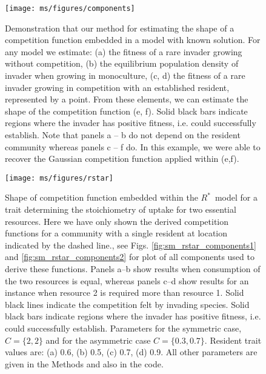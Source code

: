 \documentclass[a4paper,11pt]{article}
\newcommand{\todo}[1]{{\color{navy}{(todo: #1)}}}
\newcommand{\Rstar}{\ensuremath{R^*}}
\begin{document}
\begin{figure}[ht]
 \centering
 \texttt{[image: ms/figures/components]}
 \caption{Demonstration that our method for estimating the shape of a competition function embedded in a model with known solution. For any model we estimate: (a) the fitness of a rare invader growing without competition, (b) the equilibrium population density of invader when growing in monoculture, (c, d) the fitness of a rare invader growing in competition with an established resident, represented by a point. From these elements, we can estimate the shape of the competition function (e, f). Solid black bars indicate regions where the invader has positive fitness, i.e. could successfully establish. Note that panels a -- b do not depend on the resident community whereas panels c -- f do. In this example, we were able to recover the Gaussian competition function applied within \citet{Dieckmann-1999} (e,f).
 \todo{1. Above panels c-d, add some space and labels "At attractor" and "Away from attractor", as in Fig. 3.
 2. Remove blacks bars from figure (and also those in SuppMat) showing regions of positive fitness in panels e-f. these are not needed, as the same info is in the middle panels.
 3. Change x-axis label to same as Fig 3 (trait vale) }}
  \label{fig:components}
\end{figure}

\clearpage

\begin{figure}[ht]
  \centering
  \texttt{[image: ms/figures/rstar]}
  \caption{Shape of competition function embedded within the \Rstar\ model for a trait determining the stoichiometry of uptake for two essential resources. Here we have only shown the derived  competition functions for a community with a single resident at location indicated by the dashed line., see Figs. \ref{fig:sm_rstar_components1} and \ref{fig:sm_rstar_components2} for plot of all components used to derive these functions. Panels a--b show results when consumption of the two resources is equal, whereas panels c--d show results for an instance when resource 2 is required more than resource 1. Solid black lines indicate the competition felt by invading species. Solid black bars indicate regions where the invader has positive fitness, i.e. could successfully establish. Parameters for the symmetric case, $C = \{2, 2\}$ and for the asymmetric case $C = \{0.3, 0.7\}$. Resident trait values are: (a) 0.6, (b) 0.5, (c) 0.7, (d) 0.9. All other parameters are given in the Methods and also in the code.
  }
  \label{fig:Rstar}
\end{figure}
\end{document}
